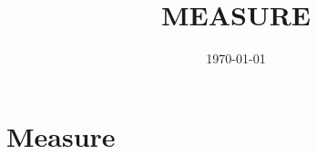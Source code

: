\documentclass[letterpaper, 11pt]{article}
\newcommand{\1}{\mathds{1}}		%
\theoremstyle{definition}
\begin{document}

\title{\normalsize\MakeUppercase{\bfseries 
Measure}}
\date{\footnotesize\MakeUppercase\today}
\maketitle
\vspace{-1cm}


% 
% 

\section{Measure}
\end{document}
